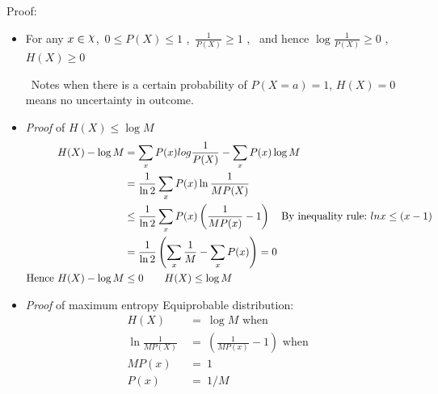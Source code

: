 \documentclass[12pt]{article}
\DeclareRobustCommand{\rchi}{{\mathpalette\irchi\relax}}
\newcommand{\irchi}[2]{\raisebox{\depth}{$#1\chi$}} %
\begin{document}
Proof:
\begin{itemize}
\item For any $x \in \rchi $, \,$0 \le P(X) \le 1$ , \,$\frac{1}{P(X)} \ge 1 $ , \, and hence $\log \frac{1}{P(X)} \ge 0$ , $H(X) \ge 0$

\quad \  Notes when there is a certain probability of $P(X=a) = 1$, $H(X) = 0$ means no uncertainty in outcome.

\item \textit{Proof} of $H(X)\le \log M$
\begin{align*} 
H(X) - \log M &= \sum_x P(x)log\frac{1}{P(X)}-\sum_x P(x)\log M \\ 
&= \frac{1}{\ln 2}\sum_x P(x)\ln\frac{1}{MP(X)} \\
&\le \frac{1}{\ln 2}\sum_x P(x)\left(\frac{1}{MP(x)} - 1\right) \textrm{\quad By inequality rule:\ } lnx \le (x-1)\\
&= \frac{1}{\ln 2}\left(\sum_x\frac{1}{M} - \sum_x P(x)\right) = 0 \\
\textrm{Hence } H(X) - \log M &\le 0 \qquad H(X)\le \log M
\end{align*}

\item \textit{Proof} of maximum entropy Equiprobable distribution: 
\begin{align*}
H(X) \ &= \ \log M \textrm{ when } \\
\ln\frac{1}{MP(X)} \ &= \ \left(\frac{1}{MP(x)} - 1\right) \textrm{ when } \\
MP(x) \ &= \ 1 \\
P(x) \ &= \ 1/M
\end{align*}
\end{itemize}
\end{document}
